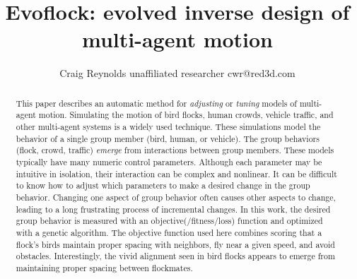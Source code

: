 \documentclass[letterpaper]{article}
\begin{document}
\title{Evoflock: evolved inverse design of multi-agent motion}

\author{Craig Reynolds\authorcr
    unaffiliated researcher\authorcr 
    cwr@red3d.com}


\captionsetup{hypcap=false}


\date{}

\maketitle



\begin{abstract}
    This paper describes an automatic method for \textit{adjusting} or \textit{tuning} models of multi-agent motion. Simulating the motion of bird flocks, human crowds, vehicle traffic, and other multi-agent systems is a widely used technique. These simulations model the behavior of a single group member (bird, human, or vehicle). The group behaviors (flock, crowd, traffic) \textit{emerge} from interactions between group members. These models typically have many numeric control parameters. Although each parameter may be intuitive in isolation, their interaction can be complex and nonlinear. It can be difficult to know how to adjust which parameters to make a desired change in the group behavior. Changing one aspect of group behavior often causes other aspects to change, leading to a long frustrating process of incremental changes. In this work, the desired group behavior is measured with an objective(/fitness/loss) function and optimized with a genetic algorithm. The objective function used here combines scoring that a flock's birds maintain proper spacing with neighbors, fly near a given speed, and avoid obstacles. Interestingly, the vivid alignment seen in bird flocks appears to emerge from maintaining proper spacing between flockmates.
\end{abstract}
\end{document}
